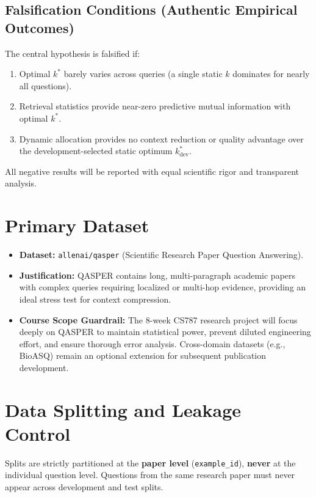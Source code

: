 \documentclass[11pt,a4paper]{article}
\begin{document}
\subsection{Falsification Conditions (Authentic Empirical Outcomes)}
The central hypothesis is falsified if:
\begin{enumerate}[label=(\alph*)]
    \item Optimal $k^*$ barely varies across queries (a single static $k$ dominates for nearly all questions).
    \item Retrieval statistics provide near-zero predictive mutual information with optimal $k^*$.
    \item Dynamic allocation provides no context reduction or quality advantage over the development-selected static optimum $k_{\text{dev}}^*$.
\end{enumerate}
All negative results will be reported with equal scientific rigor and transparent analysis.

\section{Primary Dataset}
\begin{itemize}
    \item \textbf{Dataset:} \texttt{allenai/qasper} (Scientific Research Paper Question Answering).
    \item \textbf{Justification:} QASPER contains long, multi-paragraph academic papers with complex queries requiring localized or multi-hop evidence, providing an ideal stress test for context compression.
    \item \textbf{Course Scope Guardrail:} The 8-week CS787 research project will focus deeply on QASPER to maintain statistical power, prevent diluted engineering effort, and ensure thorough error analysis. Cross-domain datasets (e.g., BioASQ) remain an optional extension for subsequent publication development.
\end{itemize}

\section{Data Splitting and Leakage Control}
\begin{warningbox}
Splits are strictly partitioned at the \textbf{paper level} (\texttt{example\_id}), \textbf{never} at the individual question level. Questions from the same research paper must never appear across development and test splits.
\end{warningbox}
\end{document}
